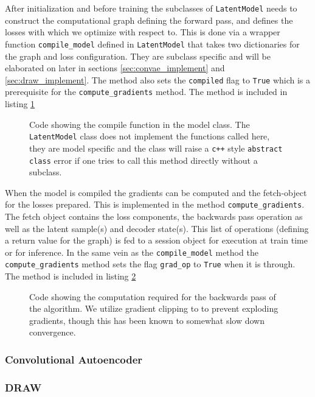 \noindent After initialization and before training the subclasses of \lstinline{LatentModel} needs to construct the computational graph defining the forward pass, and defines the losses with which we optimize with respect to. This is done via a wrapper function \lstinline{compile_model} defined in \lstinline{LatentModel} that takes two dictionaries for the graph and loss configuration. They are subclass specific and will be elaborated on later in sections \ref{sec:convae_implement} and \ref{sec:draw_implement}. The method also sets the \lstinline{compiled} flag to \lstinline{True} which is a prerequisite for the \lstinline{compute_gradients} method. The method is included in listing \ref{code:compile}

\begin{figure}

\caption{Code showing the compile function in the model class. The \lstinline{LatentModel} class does not implement the functions called here, they are model specific and the class will raise a \lstinline{c++} style \lstinline{abstract class} error if one tries to call this method directly without a subclass.}\label{code:compile}
\end{figure}

\noindent When the model is compiled the gradients can be computed and the fetch-object for the losses prepared. This is implemented in the method \lstinline{compute_gradients}. The fetch object contains the loss components, the backwards pass operation as well as the latent sample(s) and decoder state(s). This list of operations (defining a return value for the graph) is fed to a session object for execution at train time or for inference. In the same vein as the \lstinline{compile_model} method the \lstinline{compute_gradients} method sets the flag \lstinline{grad_op} to \lstinline{True} when it is through. The method is included in listing \ref{code:compute} 

\begin{figure}

\caption{Code showing the computation required for the backwards pass of the algorithm. We utilize gradient clipping to to prevent exploding gradients, though this has been known to somewhat slow down convergence.}\label{code:compute}
\end{figure}


\subsubsection*{Convolutional Autoencoder}\label{sec:convae_implement}
\subsubsection*{DRAW}\label{sec:draw_implement}